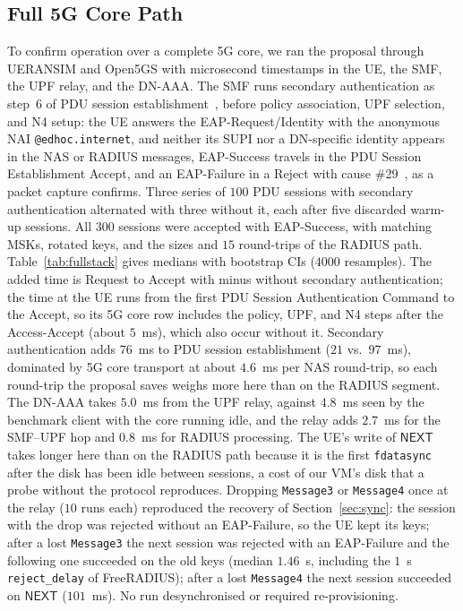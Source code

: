\documentclass[symmetry,article,submit,moreauthors]{Definitions/mdpi}
\begin{document}
\subsection{Full 5G Core Path}\label{sec:fullstack}
To confirm operation over a complete 5G core, we ran the proposal through UERANSIM and Open5GS with microsecond timestamps in the UE, the SMF, the UPF relay, and the DN-AAA. The SMF runs secondary authentication as step~6 of PDU session establishment~\cite{TS23502}, before policy association, UPF selection, and N4 setup: the UE answers the EAP-Request/Identity with the anonymous NAI \texttt{@edhoc.internet}, and neither its SUPI nor a DN-specific identity appears in the NAS or RADIUS messages, EAP-Success travels in the PDU Session Establishment Accept, and an EAP-Failure in a Reject with cause \#29~\cite{TS24501}, as a packet capture confirms. Three series of $100$ PDU sessions with secondary authentication alternated with three without it, each after five discarded warm-up sessions. All $300$ sessions were accepted with EAP-Success, with matching MSKs, rotated keys, and the sizes and $15$ round-trips of the RADIUS path. Table~\ref{tab:fullstack} gives medians with bootstrap CIs ($4000$ resamples). The added time is Request to Accept with minus without secondary authentication; the time at the UE runs from the first PDU Session Authentication Command to the Accept, so its 5G core row includes the policy, UPF, and N4 steps after the Access-Accept (about $5$~ms), which also occur without it. Secondary authentication adds $76$~ms to PDU session establishment ($21$ vs.\ $97$~ms), dominated by 5G core transport at about $4.6$~ms per NAS round-trip, so each round-trip the proposal saves weighs more here than on the RADIUS segment. The DN-AAA takes $5.0$~ms from the UPF relay, against $4.8$~ms seen by the benchmark client with the core running idle, and the relay adds $2.7$~ms for the SMF--UPF hop and $0.8$~ms for RADIUS processing. The UE's write of $\mathsf{NEXT}$ takes longer here than on the RADIUS path because it is the first \texttt{fdatasync} after the disk has been idle between sessions, a cost of our VM's disk that a probe without the protocol reproduces. Dropping \texttt{Message3} or \texttt{Message4} once at the relay ($10$ runs each) reproduced the recovery of Section~\ref{sec:sync}: the session with the drop was rejected without an EAP-Failure, so the UE kept its keys; after a lost \texttt{Message3} the next session was rejected with an EAP-Failure and the following one succeeded on the old keys (median $1.46$~s, including the $1$~s \texttt{reject\_delay} of FreeRADIUS); after a lost \texttt{Message4} the next session succeeded on $\mathsf{NEXT}$ ($101$~ms). No run desynchronised or required re-provisioning.
\end{document}

